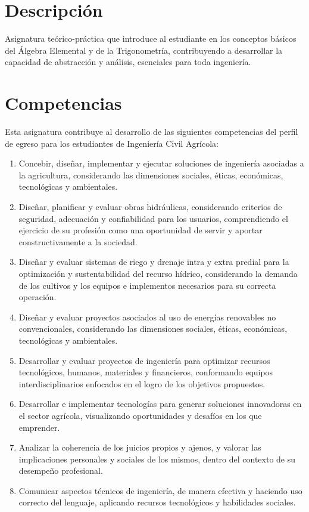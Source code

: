 \documentclass[11pt]{article}
\begin{document}
\section{Descripción}
\label{sec:org4c6b061}
Asignatura teórico-práctica que introduce al estudiante en los conceptos básicos del Álgebra Elemental y de la Trigonometría, contribuyendo a desarrollar la capacidad de abstracción y análisis, esenciales para toda ingeniería.

\section{Competencias}
\label{sec:org9751400}
Esta asignatura contribuye al desarrollo de las siguientes competencias del perfil de egreso para los estudiantes de Ingeniería Civil Agrícola:

\begin{enumerate}
\item Concebir, diseñar, implementar y ejecutar soluciones de ingeniería asociadas a la agricultura, considerando las dimensiones sociales, éticas, económicas, tecnológicas y ambientales.

\item Diseñar, planificar y evaluar obras hidráulicas, considerando criterios de seguridad, adecuación y confiabilidad para los usuarios, comprendiendo el ejercicio de su profesión como una oportunidad de servir y aportar constructivamente a la sociedad.

\item Diseñar y evaluar sistemas de riego y drenaje intra y extra predial para la optimización y sustentabilidad del recurso hídrico, considerando la demanda de los cultivos y los equipos e implementos necesarios para su correcta operación.

\item Diseñar y evaluar proyectos asociados al uso de energías renovables no convencionales, considerando las dimensiones sociales, éticas, económicas, tecnológicas y ambientales.

\item Desarrollar y evaluar proyectos de ingeniería para optimizar recursos tecnológicos, humanos, materiales y financieros, conformando equipos interdisciplinarios enfocados en el logro de los objetivos propuestos.

\item Desarrollar e implementar tecnologías para generar soluciones innovadoras en el sector agrícola, visualizando oportunidades y desafíos en los que emprender.

\item Analizar la coherencia de los juicios propios y ajenos, y valorar las implicaciones personales y sociales de los mismos, dentro del contexto de su desempeño profesional.

\item Comunicar aspectos técnicos de ingeniería, de manera efectiva y haciendo uso correcto del lenguaje, aplicando recursos tecnológicos y habilidades sociales.
\end{enumerate}
\end{document}
